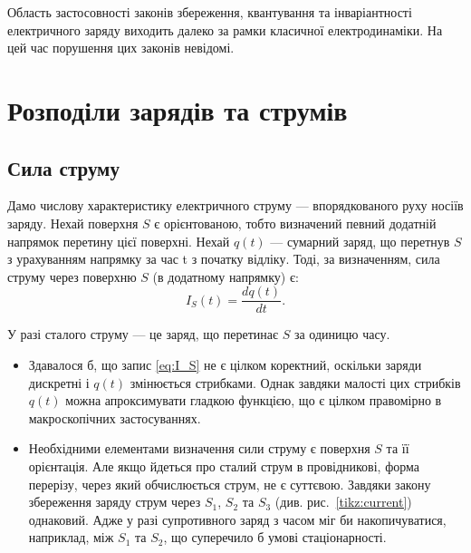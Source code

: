Область застосовності законів збереження, квантування та інваріантності
електричного заряду виходить далеко за рамки класичної електродинаміки. На
цей час порушення цих законів невідомі.


\section{Розподіли зарядів та струмів}


\subsection*{Сила струму}


Дамо числову характеристику електричного струму --- впорядкованого руху носіїв заряду.
Нехай поверхня $S$ є орієнтованою, тобто визначений певний додатній
напрямок перетину цієї поверхні. Нехай $q(t)$ --- сумарний заряд, що перетнув $S$ з
урахуванням напрямку за час t з початку відліку. Тоді, за визначенням, сила
струму через поверхню $S$ (в додатному напрямку) є:
\begin{equation}\label{eq:I_S}
    I_S(t) = \frac{dq(t)}{dt}.
\end{equation}

У разі сталого струму --- це заряд, що перетинає $S$ за одиницю часу.


\begin{itemize}
\item  Здавалося б, що запис \eqref{eq:I_S} не є цілком коректний, оскільки заряди дискретні і $q(t)$ змінюється стрибками. Однак завдяки малості цих
стрибків $q(t)$ можна апроксимувати гладкою функцією, що є цілком правомірно в макроскопічних застосуваннях.
\item  Необхідними елементами визначення сили струму є поверхня $S$ та її орієнтація. Але якщо йдеться про сталий струм в провідникові, форма перерізу,
через який обчислюється струм, не є суттєвою. Завдяки закону збереження заряду струм через $S_1$, $S_2$ та $S_3$ (див. рис.~\ref{tikz:current})
однаковий. Адже у
разі супротивного заряд з часом міг би накопичуватися, наприклад, між $S_1$ та $S_2$, що суперечило б умові стаціонарності.
\end{itemize}

